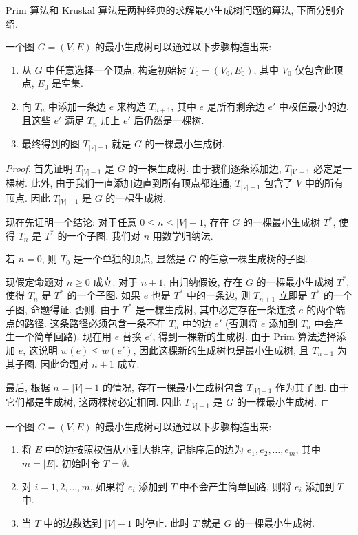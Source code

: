 Prim 算法和 Kruskal 算法是两种经典的求解最小生成树问题的算法, 下面分别介绍. 

\begin{algo}[Prim 算法]
    一个图 $G=(V,E)$ 的最小生成树可以通过以下步骤构造出来:
    \begin{enumerate}[itemindent=0ex, itemsep=0pt, label=\upshape{(\alph*)}]
        \item 从 $G$ 中任意选择一个顶点, 构造初始树 $T_0=(V_0,E_0)$, 其中 $V_0$ 仅包含此顶点, $E_0$ 是空集.
        \item 向 $T_n$ 中添加一条边 $e$ 来构造 $T_{n+1}$, 其中 $e$ 是所有剩余边 $e'$ 中权值最小的边, 且这些 $e'$ 满足 $T_n$ 加上 $e'$ 后仍然是一棵树.
        \item 最终得到的图 $T_{|V|-1}$ 就是 $G$ 的一棵最小生成树.
    \end{enumerate}
\end{algo}

\begin{proof}
    首先证明 $T_{|V|-1}$ 是 $G$ 的一棵生成树. 由于我们逐条添加边, $T_{|V|-1}$ 必定是一棵树. 此外, 由于我们一直添加边直到所有顶点都连通, $T_{|V|-1}$ 包含了 $V$ 中的所有顶点. 因此 $T_{|V|-1}$ 是 $G$ 的一棵生成树.

    现在先证明一个结论: 对于任意 $0\leq n\leq |V|-1$, 存在 $G$ 的一棵最小生成树 $T^*$, 使得 $T_n$ 是 $T^*$ 的一个子图. 我们对 $n$ 用数学归纳法.

    若 $n=0$, 则 $T_0$ 是一个单独的顶点, 显然是 $G$ 的任意一棵生成树的子图.

    现假定命题对 $n\geq 0$ 成立. 对于 $n+1$, 由归纳假设, 存在 $G$ 的一棵最小生成树 $T^*$, 使得 $T_n$ 是 $T^*$ 的一个子图. 如果 $e$ 也是 $T^*$ 中的一条边, 则 $T_{n+1}$ 立即是 $T^*$ 的一个子图, 命题得证. 否则, 由于 $T^*$ 是一棵生成树, 其中必定存在一条连接 $e$ 的两个端点的路径. 这条路径必须包含一条不在 $T_n$ 中的边 $e'$ (否则将 $e$ 添加到 $T_n$ 中会产生一个简单回路). 现在用 $e$ 替换 $e'$, 得到一棵新的生成树. 由于 Prim 算法选择添加 $e$, 这说明 $w(e)\leq w(e')$, 因此这棵新的生成树也是最小生成树, 且 $T_{n+1}$ 为其子图. 因此命题对 $n+1$ 成立.

    最后, 根据 $n=|V|-1$ 的情况, 存在一棵最小生成树包含 $T_{|V|-1}$ 作为其子图. 由于它们都是生成树, 这两棵树必定相同. 因此 $T_{|V|-1}$ 是 $G$ 的一棵最小生成树. 
\end{proof}

\begin{algo}[Kruskal 算法]
    一个图 $G=(V,E)$ 的最小生成树可以通过以下步骤构造出来:
    \begin{enumerate}[itemindent=0ex, itemsep=0pt, label=\upshape{(\alph*)}]
        \item 将 $E$ 中的边按照权值从小到大排序, 记排序后的边为 $e_1,e_2,\dots,e_{m}$, 其中 $m=|E|$. 初始时令 $T=\emptyset$.
        \item 对 $i=1,2,\dots,m$, 如果将 $e_i$ 添加到 $T$ 中不会产生简单回路, 则将 $e_i$ 添加到 $T$ 中. 
        \item 当 $T$ 中的边数达到 $|V|-1$ 时停止. 此时 $T$ 就是 $G$ 的一棵最小生成树.
    \end{enumerate}
\end{algo}

